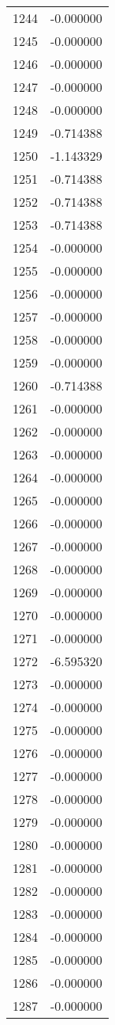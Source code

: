 \documentclass[12pt]{article}
\begin{document}
\begin{longtable}{@{}cc@{}}
1244 & -0.000000 \\
1245 & -0.000000 \\
1246 & -0.000000 \\
1247 & -0.000000 \\
1248 & -0.000000 \\
1249 & -0.714388 \\
1250 & -1.143329 \\
1251 & -0.714388 \\
1252 & -0.714388 \\
1253 & -0.714388 \\
1254 & -0.000000 \\
1255 & -0.000000 \\
1256 & -0.000000 \\
1257 & -0.000000 \\
1258 & -0.000000 \\
1259 & -0.000000 \\
1260 & -0.714388 \\
1261 & -0.000000 \\
1262 & -0.000000 \\
1263 & -0.000000 \\
1264 & -0.000000 \\
1265 & -0.000000 \\
1266 & -0.000000 \\
1267 & -0.000000 \\
1268 & -0.000000 \\
1269 & -0.000000 \\
1270 & -0.000000 \\
1271 & -0.000000 \\
1272 & -6.595320 \\
1273 & -0.000000 \\
1274 & -0.000000 \\
1275 & -0.000000 \\
1276 & -0.000000 \\
1277 & -0.000000 \\
1278 & -0.000000 \\
1279 & -0.000000 \\
1280 & -0.000000 \\
1281 & -0.000000 \\
1282 & -0.000000 \\
1283 & -0.000000 \\
1284 & -0.000000 \\
1285 & -0.000000 \\
1286 & -0.000000 \\
1287 & -0.000000 \\

\end{longtable}
\end{document}
